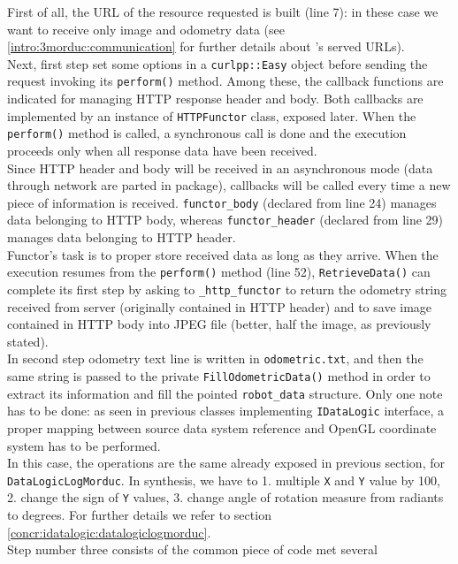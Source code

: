First of all, the URL of the resource requested is built (line 7):
in these case we want to receive only image and odometry data
(see \ref{intro:3morduc:communication} for further details about
\morduc{}'s served URLs).
\\
Next, first step set some options in a \texttt{curlpp::Easy} object
before sending the request invoking its \texttt{perform()} method. Among
these, the callback functions are indicated for managing HTTP response
header and body. Both callbacks are implemented by an instance of
\texttt{HTTPFunctor} class, exposed later. When the \texttt{perform()}
method is called, a synchronous call is done and the execution proceeds
only when all response data have been received.
\\
Since HTTP header and body will be received in an asynchronous mode
(data through network are parted in package), callbacks will be
called every time a new piece of information is received.
\texttt{functor\_body} (declared from line 24) manages data belonging
to HTTP body, whereas \texttt{functor\_header} (declared from line 29)
manages data belonging to HTTP header.
\\
Functor's task is to proper store received data as long as they arrive.
When the execution resumes from the \texttt{perform()} method (line 52),
\texttt{RetrieveData()} can complete its first step by asking
to \texttt{\_http\_functor} to return the odometry string received from server
(originally contained in HTTP header) and to save image contained in
HTTP body into JPEG file (better, half the image, as previously stated).
\\
In second step odometry text line is written in \texttt{odometric.txt},
and then the same string is passed to the private \texttt{FillOdometricData()}
method in order to extract its information and fill the pointed
\texttt{robot\_data} structure. Only one note has to be done: as seen
in previous classes implementing \texttt{IDataLogic} interface, a
proper mapping between source data system reference and OpenGL coordinate
system has to be performed.
\\
In this case, the operations are the same already exposed in previous section,
for \texttt{DataLogicLogMorduc}. In synthesis, we have to 1. multiple \texttt{X}
and \texttt{Y}
value by 100, 2. change the sign of \texttt{Y} values, 3. change angle of rotation
measure from radiants to degrees. For further details we refer to section
\ref{concr:idatalogic:datalogiclogmorduc}.
\\
Step number three consists of the common piece of code met several
